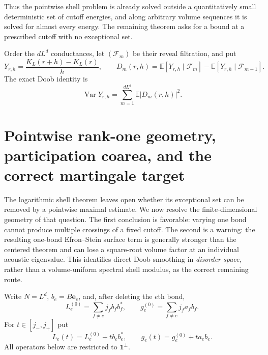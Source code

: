 \documentclass[11pt]{article}
\theoremstyle{definition}
\theoremstyle{remark}
\newcommand{\E}{\mathbb E}
\newcommand{\Var}{\operatorname{Var}}
\newcommand{\abs}[1]{\left\lvert #1\right\rvert}
\begin{document}
Thus the pointwise shell problem is already solved outside a quantitatively
small deterministic set of cutoff energies, and along arbitrary volume
sequences it is solved for almost every energy.  The remaining theorem asks
for a bound at a prescribed cutoff with no exceptional set.

Order the $dL^d$ conductances, let $(\mathcal F_m)$ be their reveal filtration,
and put
\begin{equation}
 Y_{r,h}=\frac{K_L(r+h)-K_L(r)}h,
 \qquad
 D_m(r,h)=\E[Y_{r,h}\mid\mathcal F_m]
 -\E[Y_{r,h}\mid\mathcal F_{m-1}].
 \label{eq:integrated-Doob-increments}
\end{equation}
The exact Doob identity is
\begin{equation}
 \Var Y_{r,h}=\sum_{m=1}^{dL^d}\E\abs{D_m(r,h)}^2.
 \label{eq:integrated-Doob-identity}
\end{equation}


\section{Pointwise rank-one geometry, participation coarea, and the correct martingale target}
\label{sec:pointwise-rank-one-coarea}

The logarithmic shell theorem leaves open whether its exceptional set can be
removed by a pointwise maximal estimate.  We now resolve the finite-dimensional
geometry of that question.  The first conclusion is favorable: varying one
bond cannot produce multiple crossings of a fixed cutoff.  The second is a
warning: the resulting one-bond Efron--Stein surface term is generally stronger
than the centered theorem and can lose a square-root volume factor at an
individual acoustic eigenvalue.  This identifies direct Doob smoothing in
\emph{disorder space}, rather than a volume-uniform spectral shell modulus, as
the correct remaining route.

Write $N=L^d$, $b_e=B\mathbf e_e$, and, after deleting the $e$th bond,
\begin{equation}
 L_e^{(0)}=\sum_{f\ne e}j_fb_fb_f^*,
 \qquad
 g_e^{(0)}=\sum_{f\ne e}j_fa_fb_f.
 \label{eq:leave-one-edge-operator-source}
\end{equation}
For $t\in[j_-,j_+]$ put
\begin{equation}
 L_e(t)=L_e^{(0)}+tb_eb_e^*,
 \qquad
 g_e(t)=g_e^{(0)}+ta_eb_e.
 \label{eq:one-edge-rank-one-path}
\end{equation}
All operators below are restricted to $\mathbf1^\perp$.
\end{document}
